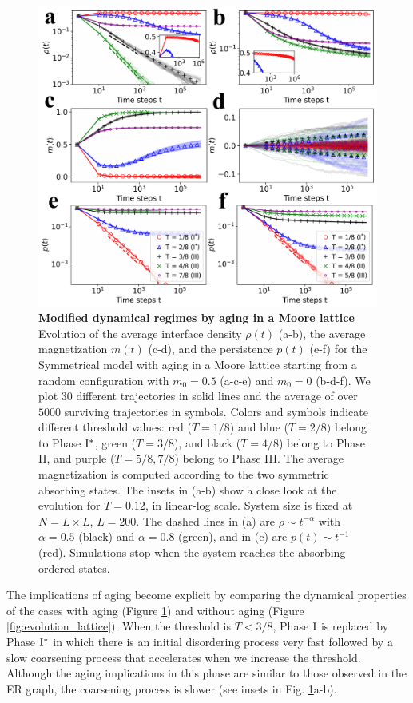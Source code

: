 \begin{figure}
        \centering
        \includegraphics[width=\linewidth]{Figs/Aging_STM/FIG12.pdf}
        \caption{\label{fig:evolution_lattice_aging} \textbf{Modified dynamical regimes by aging in a Moore lattice} Evolution of the average interface density $\rho(t)$ (a-b), the average magnetization $m(t)$ (c-d), and the persistence $p(t)$ (e-f) for the Symmetrical model with aging in a Moore lattice starting from a random configuration with $m_0 = 0.5$ (a-c-e) and $m_0 = 0$ (b-d-f). We plot 30 different trajectories in solid lines and the average of over $5000$ surviving trajectories in symbols. Colors and symbols indicate different threshold values: red ($T = 1/8$) and blue ($T = 2/8)$ belong to Phase ${\rm I}^{*}$, green ($T = 3/8$), and black ($T=4/8$) belong to Phase II, and purple ($T = 5/8, 7/8$) belong to Phase III. The average magnetization is computed according to the two symmetric absorbing states. The insets in (a-b) show a close look at the evolution for $T = 0.12$, in linear-log scale. System size is fixed at $N = L \times L$, $L = 200$. The dashed lines in (a) are $\rho \sim t^{-\alpha}$ with $\alpha = 0.5$ (black) and $\alpha = 0.8$ (green), and in (c) are $p(t) \sim t^{-1}$ (red). 
        Simulations stop when the system reaches the absorbing ordered states.}
\end{figure}

The implications of aging become explicit by comparing the dynamical properties of the cases with aging (Figure \ref{fig:evolution_lattice_aging}) and without aging (Figure \ref{fig:evolution_lattice}). When the threshold is $T<3/8$, Phase ${\rm I}$ is replaced by Phase ${\rm I}^{*}$ in which there is an initial disordering process very fast followed by a slow coarsening process that accelerates when we increase the threshold. Although the aging implications in this phase are similar to those observed in the ER graph, the coarsening process is slower  (see insets in Fig. \ref{fig:evolution_lattice_aging}a-b).

